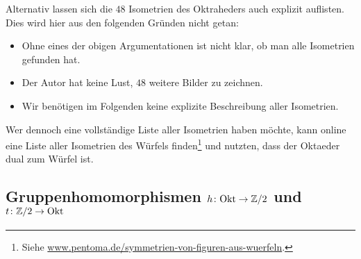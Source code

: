 Alternativ lassen sich die $48$ Isometrien des Oktraheders auch explizit auflisten.
Dies wird hier aus den folgenden Gründen nicht getan:
\begin{itemize}
  \item
    Ohne eines der obigen Argumentationen ist nicht klar, ob man alle Isometrien gefunden hat.
  \item
    Der Autor hat keine Lust, $48$ weitere Bilder zu zeichnen.
  \item
    Wir benötigen im Folgenden keine explizite Beschreibung aller Isometrien.
\end{itemize}
Wer dennoch eine vollständige Liste aller Isometrien haben möchte, kann online eine Liste aller Isometrien des Würfels finden\footnote{Siehe \url{www.pentoma.de/symmetrien-von-figuren-aus-wuerfeln}.} und nutzten, dass der Oktaeder dual zum Würfel ist.





\subsection*{Gruppenhomomorphismen $h \colon \mathrm{Okt} \to \mathbb{Z}/2$ und $t \colon \mathbb{Z}/2 \to \mathrm{Okt}$}

